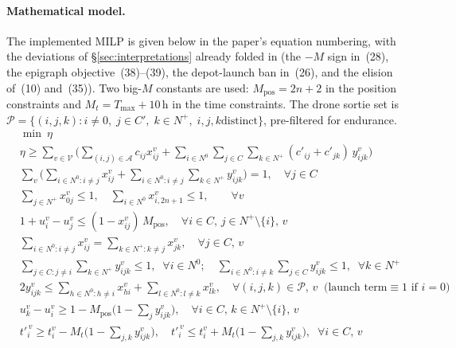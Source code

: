 \documentclass[11pt,a4paper]{article}
\newcommand{\Nplus}{N^{+}}
\newcommand{\NO}{N^{0}}
\newcommand{\Cprime}{C'}
\begin{document}
\paragraph{Mathematical model.}
The implemented MILP is given below in the paper's equation numbering, with
the deviations of \S\ref{sec:interpretations} already folded in (the
$-M$ sign in~(28), the epigraph objective~(38)--(39), the depot-launch ban
in~(26), and the elision of~(10) and~(35)). Two big-$M$ constants are used:
$M_{\mathrm{pos}}=2n{+}2$ in the position constraints and
$M_t=T_{\max}+10$\,h in the time constraints. The drone sortie set is
$\mathcal P=\{(i,j,k):i\ne 0,\;j\in\Cprime,\;k\in\Nplus,\;i,j,k\text{
distinct}\}$, pre-filtered for endurance.
{\footnotesize
\allowdisplaybreaks
\begin{align}
& \min~ \eta \tag{38}\\
& \eta \ge \sum_{v\in\mathcal V}\Big(\sum_{(i,j)\in\mathcal A} c_{ij}x^{v}_{ij}
   +\sum_{i\in\NO}\sum_{j\in C}\sum_{k\in\Nplus}(c'_{ij}+c'_{jk})\,y^{v}_{ijk}\Big) \tag{39}\\
& \sum_{v}\Big(\sum_{i\in\NO:i\ne j}x^{v}_{ij}
   +\sum_{i\in\NO:i\ne j}\sum_{k\in\Nplus}y^{v}_{ijk}\Big)=1,
   \quad \forall j\in C \tag{2}\\
& \sum_{j\in\Nplus}x^{v}_{0j}\le 1,\quad
  \sum_{i\in\NO}x^{v}_{i,2n+1}\le 1,
   \qquad \forall v \tag{3,4}\\
& 1+u^{v}_{i}-u^{v}_{j}\le(1-x^{v}_{ij})\,M_{\mathrm{pos}},
   \quad \forall i\in C,\,j\in\Nplus\!\setminus\!\{i\},\,v \tag{5}\\
& \sum_{i\in\NO:i\ne j}x^{v}_{ij}=\sum_{k\in\Nplus:k\ne j}x^{v}_{jk},
   \quad \forall j\in C,\,v \tag{6}\\
& \sum_{j\in C:j\ne i}\sum_{k\in\Nplus}y^{v}_{ijk}\le 1,\;\;\forall i\in\NO;\quad
  \sum_{i\in\NO:i\ne k}\sum_{j\in C}y^{v}_{ijk}\le 1,\;\;\forall k\in\Nplus \tag{7,8}\\
& 2y^{v}_{ijk}\le \textstyle\sum_{h\in\NO:h\ne i}x^{v}_{hi}
   +\sum_{l\in\NO:l\ne k}x^{v}_{lk},
   \quad \forall (i,j,k)\in\mathcal P,\,v
   \;\;\text{(launch term}\equiv 1\text{ if }i{=}0) \tag{9}\\
& u^{v}_{k}-u^{v}_{i}\ge 1-M_{\mathrm{pos}}\big(1-\textstyle\sum_{j}y^{v}_{ijk}\big),
   \quad \forall i\in C,\,k\in\Nplus\!\setminus\!\{i\},\,v \tag{11}\\
& t'^{\,v}_{i}\ge t^{v}_{i}-M_t\big(1-\textstyle\sum_{j,k}y^{v}_{ijk}\big),\quad
  t'^{\,v}_{i}\le t^{v}_{i}+M_t\big(1-\textstyle\sum_{j,k}y^{v}_{ijk}\big),
   \;\; \forall i\in C,\,v \tag{12,13}\\

\end{align}}
\end{document}
